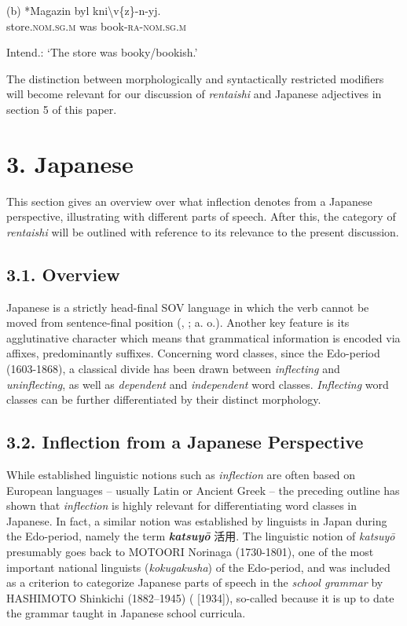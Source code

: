 \documentclass[output=paper]{langscibook}
\begin{document}
\begin{styleBeispielCinqueKapitel}
(b) *Magazin byl kni{\textbackslash}v\{z\}-n-yj.\\
store.\textsc{nom.sg.m} was book\textsc{{}-ra}{}-\textsc{nom.sg.m}
\end{styleBeispielCinqueKapitel}

\begin{styleBeispielCinqueKapitel}
Intend.: ‘The store was booky/bookish.’ \citep[100]{Mezhevich2002} 
\end{styleBeispielCinqueKapitel}

The distinction between morphologically and syntactically restricted modifiers will become relevant for our discussion of \textit{rentaishi} and Japanese adjectives in section 5 of this paper.

\section{3. Japanese}

This section gives an overview over what inflection denotes from a Japanese perspective, illustrating with different parts of speech. After this, the category of \textit{rentaishi} will be outlined with reference to its relevance to the present discussion.

\subsection{3.1. Overview}

Japanese is a strictly head-final SOV language in which the verb cannot be moved from sentence-final position (\citealt{Kuno1973}, \citealt{Martin1975}; \citealt{Iwasaki2013} a. o.). Another key feature is its agglutinative character which means that grammatical information is encoded via affixes, predominantly suffixes. Concerning word classes, since the Edo-period (1603-1868), a classical divide has been drawn between \textit{inflecting} and \textit{uninflecting}, as well as \textit{dependent} and \textit{independent} word classes. \textit{Inflecting} word classes can be further differentiated by their distinct morphology.

\subsection{3.2. Inflection from a Japanese Perspective}

While established linguistic notions such as \textit{inflection} are often based on European languages – usually Latin or Ancient Greek – the preceding outline has shown that \textit{inflection} is highly relevant for differentiating word classes in Japanese. In fact, a similar notion was established by linguists in Japan during the Edo-period, namely the term \textbf{\textit{katsuyō} }活用. The linguistic notion of \textit{katsuyō} presumably goes back to MOTOORI Norinaga (1730-1801), one of the most important national linguists (\textit{kokugakusha}) of the Edo-period, and was included as a criterion to categorize Japanese parts of speech in the \textit{school grammar} by HASHIMOTO Shinkichi (1882–1945) (\citealt{Hashimoto1948} [1934]), so-called because it is up to date the grammar taught in Japanese school curricula.
\end{document}
